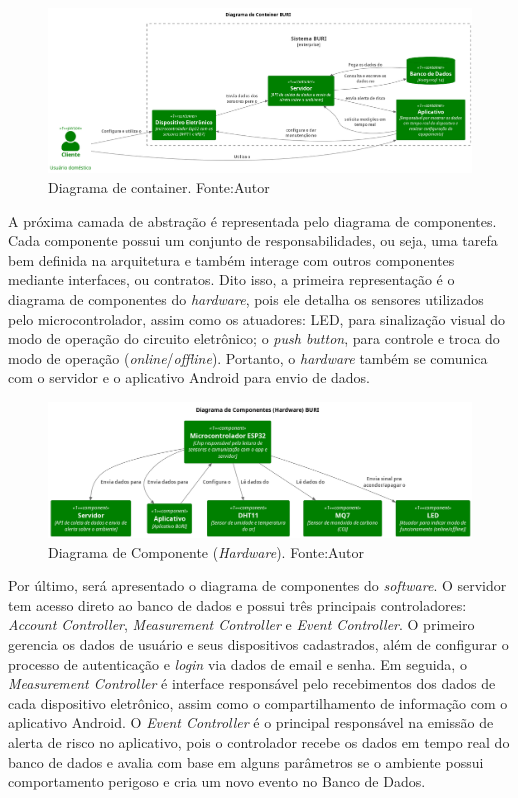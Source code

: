 \begin{figure}[ht]
    \centering
    \includegraphics[width=.94\textwidth]{img/conteiner-diagram.png}
    \caption{Diagrama de container. Fonte:Autor}\label{figConteinerDiagram}
\end{figure}

A próxima camada de abstração é representada pelo diagrama de componentes. Cada componente possui um conjunto de responsabilidades, ou seja, uma tarefa 
bem definida na arquitetura e também interage com outros componentes mediante interfaces, ou contratos. Dito isso, a primeira representação é o diagrama de componentes do \textit{hardware}, pois ele detalha 
os sensores utilizados pelo microcontrolador, assim como os atuadores: LED, para sinalização visual do modo de operação do circuito eletrônico; o \textit{push button}, para controle e troca do modo de operação (\textit{online}/\textit{offline}). Portanto, 
o \textit{hardware} também se comunica com o servidor e o aplicativo Android para envio de dados.

\begin{figure}[ht]
    \centering
    \includegraphics[width=.84\textwidth]{img/component-diagram-hardware.png}
    \caption{Diagrama de Componente (\textit{Hardware}). Fonte:Autor}\label{figComponentHardware}
\end{figure}

Por último, será apresentado o diagrama de componentes do \textit{software}. O servidor tem acesso direto ao banco de dados e possui três principais controladores: \textit{Account Controller}, \textit{Measurement Controller} e \textit{Event Controller}. O primeiro 
gerencia os dados de usuário e seus dispositivos cadastrados, além de configurar o processo de autenticação e \textit{login} via dados de email e senha. Em seguida, o \textit{Measurement Controller} é interface responsável pelo recebimentos dos dados de cada dispositivo eletrônico, assim como 
o compartilhamento de informação com o aplicativo Android. O \textit{Event Controller} é o principal responsável na emissão de alerta de risco no aplicativo, pois o controlador recebe os dados em tempo real do banco de dados e avalia 
com base em alguns parâmetros se o ambiente possui comportamento perigoso e cria um novo evento no Banco de Dados.

